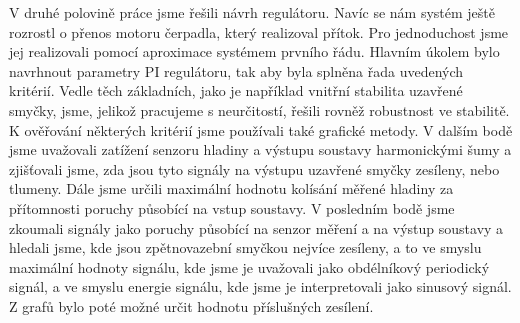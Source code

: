 \documentclass[a4paper,11pt]{article}
\begin{document}
V druhé polovině práce jsme řešili návrh regulátoru. Navíc se nám systém ještě rozrostl o přenos motoru čerpadla, který realizoval přítok. Pro jednoduchost jsme jej realizovali pomocí aproximace systémem prvního řádu. Hlavním úkolem bylo navrhnout parametry PI regulátoru, tak aby byla splněna řada uvedených kritérií. Vedle těch základních, jako je například vnitřní stabilita uzavřené smyčky, jsme, jelikož pracujeme s neurčitostí, řešili rovněž robustnost ve stabilitě. K ověřování některých kritérií jsme používali také grafické metody. V dalším bodě jsme uvažovali zatížení senzoru hladiny a výstupu soustavy harmonickými šumy a zjišťovali jsme, zda jsou tyto signály na výstupu uzavřené smyčky zesíleny, nebo tlumeny. Dále jsme určili maximální hodnotu kolísání měřené hladiny za přítomnosti poruchy působící na vstup soustavy. V posledním bodě jsme zkoumali signály jako poruchy působící na senzor měření a na výstup soustavy a hledali jsme, kde jsou zpětnovazební smyčkou nejvíce zesíleny, a to ve smyslu maximální hodnoty signálu, kde jsme je uvažovali jako obdélníkový periodický signál, a ve smyslu energie signálu, kde jsme je interpretovali jako sinusový signál. Z grafů bylo poté možné určit hodnotu příslušných zesílení.
\end{document}
